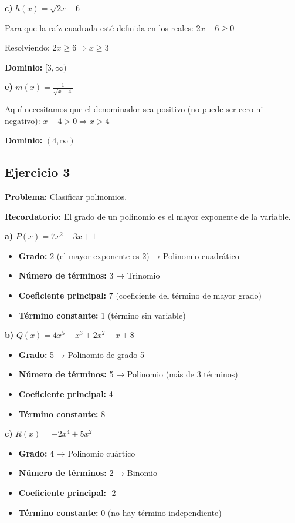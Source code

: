 \textbf{c)} $h(x) = \sqrt{2x - 6}$

Para que la raíz cuadrada esté definida en los reales: $2x - 6 \geq 0$

Resolviendo: $2x \geq 6 \Rightarrow x \geq 3$

\textbf{Dominio:} $[3, \infty)$

\textbf{e)} $m(x) = \frac{1}{\sqrt{x - 4}}$

Aquí necesitamos que el denominador sea positivo (no puede ser cero ni negativo):
$x - 4 > 0 \Rightarrow x > 4$

\textbf{Dominio:} $(4, \infty)$

\subsection*{Ejercicio 3}

\textbf{Problema:} Clasificar polinomios.

\textbf{Recordatorio:} El grado de un polinomio es el mayor exponente de la variable.

\textbf{a)} $P(x) = 7x^2 - 3x + 1$

\begin{itemize}
    \item \textbf{Grado:} 2 (el mayor exponente es 2) → Polinomio cuadrático
    \item \textbf{Número de términos:} 3 → Trinomio
    \item \textbf{Coeficiente principal:} 7 (coeficiente del término de mayor grado)
    \item \textbf{Término constante:} 1 (término sin variable)
\end{itemize}

\textbf{b)} $Q(x) = 4x^5 - x^3 + 2x^2 - x + 8$

\begin{itemize}
    \item \textbf{Grado:} 5 → Polinomio de grado 5
    \item \textbf{Número de términos:} 5 → Polinomio (más de 3 términos)
    \item \textbf{Coeficiente principal:} 4
    \item \textbf{Término constante:} 8
\end{itemize}

\textbf{c)} $R(x) = -2x^4 + 5x^2$

\begin{itemize}
    \item \textbf{Grado:} 4 → Polinomio cuártico
    \item \textbf{Número de términos:} 2 → Binomio
    \item \textbf{Coeficiente principal:} -2
    \item \textbf{Término constante:} 0 (no hay término independiente)
\end{itemize}

